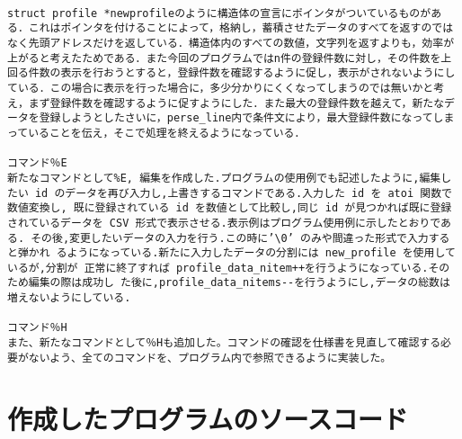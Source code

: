 \documentclass[a4j]{jarticle}
\begin{document}
\begin{verbatim}

struct profile *newprofileのように構造体の宣言にポインタがついているものがある．これはポインタを付けることによって，格納し，蓄積させたデータのすべてを返すのではなく先頭アドレスだけを返している．構造体内のすべての数値，文字列を返すよりも，効率が上がると考えたためである．また今回のプログラムではn件の登録件数に対し，その件数を上回る件数の表示を行おうとすると，登録件数を確認するように促し，表示がされないようにしている．この場合に表示を行った場合に，多少分かりにくくなってしまうのでは無いかと考え，まず登録件数を確認するように促すようにした．また最大の登録件数を越えて，新たなデータを登録しようとしたさいに，perse_line内で条件文により，最大登録件数になってしまっていることを伝え，そこで処理を終えるようになっている．

コマンド％E
新たなコマンドとして%E, 編集を作成した.プログラムの使用例でも記述したように,編集したい id のデータを再び入力し,上書きするコマンドである.入力した id を atoi 関数で数値変換し, 既に登録されている id を数値として比較し,同じ id が見つかれば既に登録されているデータを CSV 形式で表示させる.表示例はプログラム使用例に示したとおりである. その後,変更したいデータの入力を行う.この時に’\0’ のみや間違った形式で入力すると弾かれ るようになっている.新たに入力したデータの分割には new_profile を使用しているが,分割が 正常に終了すれば profile_data_nitem++を行うようになっている.そのため編集の際は成功し た後に,profile_data_nitems--を行うようにし,データの総数は増えないようにしている.

コマンド％H
また、新たなコマンドとして％Hも追加した。コマンドの確認を仕様書を見直して確認する必要がないよう、全てのコマンドを、プログラム内で参照できるように実装した。

\end{verbatim}

\newpage

%
%

\section{作成したプログラムのソースコード}




\end{document}

